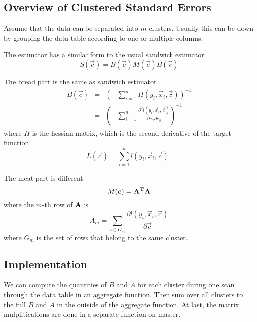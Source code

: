 \subsection{Overview of Clustered Standard Errors}

Assume that the data can be separated into $m$ clusters. Usually this
can be down by grouping the data table according to one or multiple
columns.

The estimator has a similar form to the usual sandwich estimator
\begin{equation}
  S(\vec{c}) = B(\vec{c}) M(\vec{c}) B(\vec{c})
\end{equation}

The bread part is the same as sandwich estimator
\begin{eqnarray}
  B(\vec{c}) & = & \left(-\sum_{i=1}^{n} H(y_i, \vec{x}_i,
    \vec{c})\right)^{-1}\\
  & = & \left(-\sum_{i=1}^{n}\frac{\partial^2 l(y_i, \vec{x}_i,
      \vec{c})}{\partial c_\alpha \partial c_\beta}\right)^{-1}
\end{eqnarray}
where $H$ is the hessian matrix, which is the second derivative of the
target function
\begin{equation}
  L(\vec{c}) = \sum_{i=1}^n l(y_i, \vec{x}_i, \vec{c})\ .
\end{equation}

The meat part is different
\begin{equation}
  M(\vec{c}) = \bf{A}^T\bf{A}
\end{equation}
where the $m$-th row of $\bf{A}$ is
\begin{equation}
  A_m = \sum_{i\in G_m}\frac{\partial
      l(y_i,\vec{x}_i,\vec{c})}{\partial \vec{c}}
\end{equation}
where $G_m$ is the set of rows that belong to the same cluster.

\subsection{Implementation}

We can compute the quantities of $B$ and $A$ for each cluster during one scan through
the data table in an aggregate function. Then sum over all clusters to
the full $B$ and $A$ in the outside of the aggregate function. At last, the matrix mulplitications
are done in a separate function on master.

